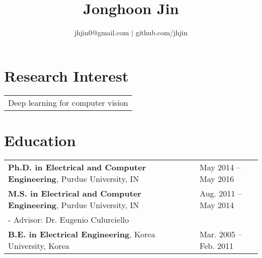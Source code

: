 \documentclass[11pt]{article}
\title{\vspace{-40pt}\bfseries\huge Jonghoon Jin \vspace{-20pt}}
\author{
\small jhjin0@gmail.com $\vert$ github.com/jhjin \\
}
\date{\vspace{-20pt}}
\begin{document}
\maketitle


\section*{Research Interest}
\begin{tabular}{L{\textwidth}}
  Deep learning for computer vision \\
\end{tabular}

\section*{Education}
\begin{tabular}{L{0.74\textwidth} R{0.22\textwidth}}
  {\bf Ph.D. in Electrical and Computer Engineering}, Purdue University, IN        & May 2014 -- May 2016 \\ [0pt]
  {\bf M.S. in Electrical and Computer Engineering}, Purdue University, IN         & Aug. 2011 -- May 2014 \\ [0pt]
  - Advisor: Dr. Eugenio Culurciello \\ [7pt]
  {\bf B.E. in Electrical Engineering}, Korea University, Korea                    & Mar. 2005 -- Feb. 2011 \\ [0pt]
\end{tabular}
\end{document}
